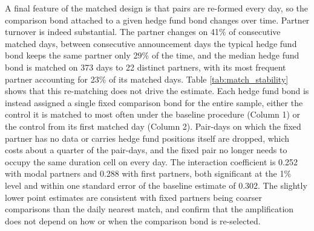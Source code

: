 \documentclass[english, 11pt, oneside]{article}
\begin{document}
\begin{table}[h!]
\caption*{\textit{Notes:} This table re-estimates the matched-sample specification of Column (5) in Table \ref{tab:baseline}. The dependent variable is the daily change in bond yield (bps). \textit{HF Involved} indicates the hedge fund side of each matched pair. \textit{Gap} refers to the absolute within-pair difference in bid-ask spread (\euro) at the time of matching. The thresholds in Columns (3) and (4) correspond to the median and the 25th percentile of the gap distribution. Columns (5) and (6) use the full matched sample and allow the yield response to the shock to vary with the bid-ask spread, and additionally with residual maturity and amount issued. The main effects of the interacted characteristics are included. The Shock main effect is absorbed by the matched-pair fixed effects. Standard errors are clustered by Duration $\times$ Date $\times$ Country and non-HF bond. *** p$<$0.01, ** p$<$0.05, * p$<$0.10. \\ Sample period: 2021-01-01 -- 2025-11-01}
\end{table}

A final feature of the matched design is that pairs are re-formed every day, so the comparison bond attached to a given hedge fund bond changes over time. Partner turnover is indeed substantial. The partner changes on 41\% of consecutive matched days, between consecutive announcement days the typical hedge fund bond keeps the same partner only 29\% of the time, and the median hedge fund bond is matched on 373 days to 22 distinct partners, with its most frequent partner accounting for 23\% of its matched days. Table \ref{tab:match_stability} shows that this re-matching does not drive the estimate. Each hedge fund bond is instead assigned a single fixed comparison bond for the entire sample, either the control it is matched to most often under the baseline procedure (Column 1) or the control from its first matched day (Column 2). Pair-days on which the fixed partner has no data or carries hedge fund positions itself are dropped, which costs about a quarter of the pair-days, and the fixed pair no longer needs to occupy the same duration cell on every day. The interaction coefficient is 0.252 with modal partners and 0.288 with first partners, both significant at the 1\% level and within one standard error of the baseline estimate of 0.302. The slightly lower point estimates are consistent with fixed partners being coarser comparisons than the daily nearest match, and confirm that the amplification does not depend on how or when the comparison bond is re-selected. \\
\end{document}

